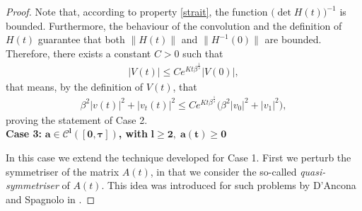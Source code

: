 \documentclass[12pt,oneside,a4paper]{book}
\numberwithin{equation}{section}     %
\theoremstyle{plain}
\theoremstyle{definition}
\begin{document}
\begin{proof}
	Note that, according to property \eqref{strait}, the function $\big(\det H(t)\big)^{-1}$ is bounded. Furthermore, the  behaviour of the convolution and the definition of $H(t)$ guarantee that both $\|H(t)\|$ and $\|H^{-1}(0)\|$ are bounded. Therefore, there exists a constant $C>0$ such that
	\begin{align*}
	|V(t)|\leq C e^{Kt\beta^{\frac{1}{s}}}|V(0)|,
	\end{align*}
	that means, by the definition of $V(t)$, that
	\begin{align*}
	\beta^2|v(t)|^2+|v_t(t)|^2\leq C e^{Kt\beta^{\frac{1}{s}}}\big(\beta^2|v_0|^2+|v_1|^2\big),
	\end{align*}
	proving the statement of Case 2. \\
	
	
	\textbf{Case 3:} $\bm{a\in\mathcal C^l([0,\tau])}$\textbf{, with} $\bm{l\geq 2,\; a(t)\geq 0}$
	
	In this case we extend the technique developed for Case 1. First we perturb the symmetriser of the matrix $A(t)$, in that we consider the so-called \textit{quasi-symmetriser} of $A(t)$. This idea was introduced for such problems by D'Ancona and Spagnolo in \cite{DS1998}.
	

\end{proof}
\end{document}
